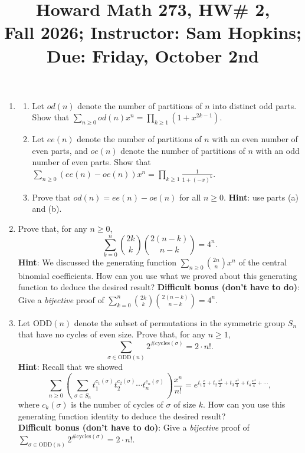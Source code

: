 \documentclass[11pt]{article}
\title{Howard Math 273, HW\# 2, \\ {\normalsize Fall 2026; Instructor: Sam Hopkins; Due: Friday, October 2nd}}
\date{}
\begin{document}
\maketitle

\thispagestyle{empty}

\vspace{-1.8cm}

\begin{enumerate}

\item \begin{enumerate}

\item Let $od(n)$ denote the number of partitions of $n$ into distinct odd parts. Show that $\displaystyle \sum_{n \geq 0} od(n) x^n = \prod_{k \geq 1} (1+x^{2k-1})$.

\item Let $ee(n)$ denote the number of partitions of $n$ with an even number of even parts, and $oe(n)$ denote the number of partitions of $n$ with an odd number of even parts. Show that $\displaystyle \sum_{n \geq 0} (ee(n)-oe(n)) x^n = \prod_{k \geq 1} \frac{1}{1+(-x)^k}$.

\item Prove that $od(n) = ee(n)-oe(n)$ for all $n \geq 0$. {\bf Hint}: use parts (a) and (b).

\end{enumerate}

\item Prove that, for any $n \geq 0$,
\[ \sum_{k=0}^{n} \binom{2k}{k}\binom{2(n-k)}{n-k} = 4^n. \]
{\bf Hint}: We discussed the generating function $\sum_{n\geq 0} \binom{2n}{n}x^n$ of the central binomial coefficients. How can you use what we proved about this generating function to deduce the desired result?
{\bf Difficult bonus (don't have to do)}: Give a \emph{bijective} proof of $\sum_{k=0}^{n} \binom{2k}{k}\binom{2(n-k)}{n-k} = 4^n$.

\item Let $\mathrm{ODD}(n)$ denote the subset of permutations in the symmetric group $S_n$ that have no cycles of even size. Prove that, for any $n \geq 1$,
\[ \sum_{\sigma \in \mathrm{ODD}(n)} 2^{\#\mathrm{cycles}(\sigma)} = 2\cdot n!. \]
{\bf Hint}: Recall that we showed
\[ \sum_{n \geq 0}  \left( \, \sum_{\sigma\in S_n} t_1^{c_1(\sigma)} t_2^{c_2(\sigma)} \cdots t_n^{c_n(\sigma)} \, \right)  \frac{x^n}{n!} = e^{t_1 \frac{x}{1} + t_2\frac{x^2}{2} + t_3\frac{x^3}{3} + t_4\frac{x^4}{4} + \cdots},\]
where $c_k(\sigma)$ is the number of cycles of $\sigma$ of size $k$. How can you use this generating function identity to deduce the desired result?\\
{\bf Difficult bonus (don't have to do)}: Give a \emph{bijective} proof of $\sum_{\sigma \in \mathrm{ODD}(n)} 2^{\#\mathrm{cycles}(\sigma)} = 2\cdot n!$.


\end{enumerate}
\end{document}
